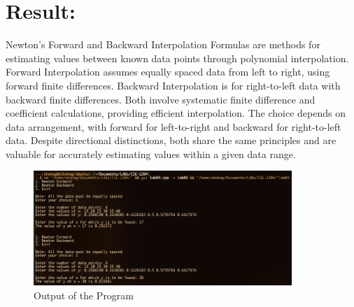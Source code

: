 \documentclass[a4paper,12pt]{report}
\begin{document}
\section*{Result:}
\qquad Newton's Forward and Backward Interpolation Formulas are methods for estimating values between known data points through polynomial interpolation. Forward Interpolation assumes equally spaced data from left to right, using forward finite differences. Backward Interpolation is for right-to-left data with backward finite differences. Both involve systematic finite difference and coefficient calculations, providing efficient interpolation. The choice depends on data arrangement, with forward for left-to-right and backward for right-to-left data. Despite directional distinctions, both share the same principles and are valuable for accurately estimating values within a given data range.

\begin{figure}[H]
    \centering
    \includegraphics[width=0.87\textwidth]{result.png}
    \caption{Output of the Program}
    \label{fig:result}
\end{figure}
\end{document}
